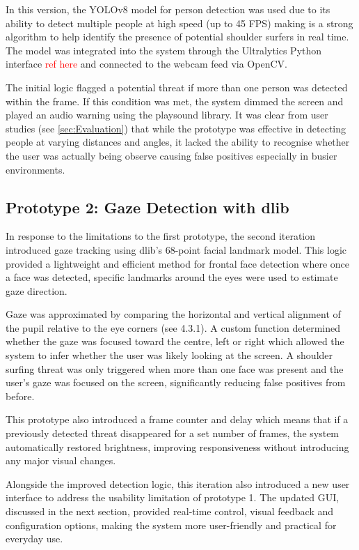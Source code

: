 \documentclass[12pt]{article}
\theoremstyle{plain}
\theoremstyle{definition}
\begin{document}
In this version, the YOLOv8 model for person detection was used due to its ability to detect multiple people at high speed (up to 45 FPS) making is a strong algorithm to help identify the presence of potential shoulder surfers in real time. The model was integrated into the system through the Ultralytics Python interface \textcolor{red}{ref here} and connected to the webcam feed via OpenCV.

The initial logic flagged a potential threat if more than one person was detected within the frame. If this condition was met, the system dimmed the screen and played an audio warning using the playsound library. It was clear from user studies (see \ref{sec:Evaluation}) that while the prototype was effective in detecting people at varying distances and angles, it lacked the ability to recognise whether the user was actually being observe causing false positives especially in busier environments.

\subsection{Prototype 2: Gaze Detection with dlib}

In response to the limitations to the first prototype, the second iteration introduced gaze tracking using dlib’s 68-point facial landmark model. This logic provided a lightweight and efficient method for frontal face detection where once a face was detected, specific landmarks around the eyes were used to estimate gaze direction.

Gaze was approximated by comparing the horizontal and vertical alignment of the pupil relative to the eye corners (see 4.3.1). A custom function determined whether the gaze was focused toward the centre, left or right which allowed the system to infer whether the user was likely looking at the screen. A shoulder surfing threat was only triggered when more than one face was present and the user’s gaze was focused on the screen, significantly reducing false positives from before.

This prototype also introduced a frame counter and delay which means that if a previously detected threat disappeared for a set number of frames, the system automatically restored brightness, improving responsiveness without introducing any major visual changes.

Alongside the improved detection logic, this iteration also introduced a new user interface to address the usability limitation of prototype 1. The updated GUI, discussed in the next section, provided real-time control, visual feedback and configuration options, making the system more user-friendly and practical for everyday use.
\end{document}
